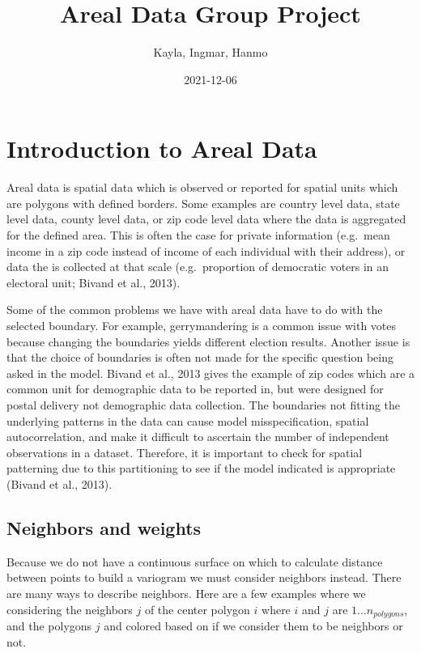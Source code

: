 \documentclass[
]{article}
\title{Areal Data Group Project}
\author{Kayla, Ingmar, Hanmo}
\date{2021-12-06}
\begin{document}
\maketitle

{
\setcounter{tocdepth}{3}
\tableofcontents
}
\newpage

\hypertarget{introduction-to-areal-data}{%
\section{Introduction to Areal Data}\label{introduction-to-areal-data}}

Areal data is spatial data which is observed or reported for spatial
units which are polygons with defined borders. Some examples are country
level data, state level data, county level data, or zip code level data
where the data is aggregated for the defined area. This is often the
case for private information (e.g.~mean income in a zip code instead of
income of each individual with their address), or data the is collected
at that scale (e.g.~proportion of democratic voters in an electoral
unit; Bivand et al., 2013).

Some of the common problems we have with areal data have to do with the
selected boundary. For example, gerrymandering is a common issue with
votes because changing the boundaries yields different election results.
Another issue is that the choice of boundaries is often not made for the
specific question being asked in the model. Bivand et al., 2013 gives
the example of zip codes which are a common unit for demographic data to
be reported in, but were designed for postal delivery not demographic
data collection. The boundaries not fitting the underlying patterns in
the data can cause model misspecification, spatial autocorrelation, and
make it difficult to ascertain the number of independent observations in
a dataset. Therefore, it is important to check for spatial patterning
due to this partitioning to see if the model indicated is appropriate
(Bivand et al., 2013).

\hypertarget{neighbors-and-weights}{%
\subsection{Neighbors and weights}\label{neighbors-and-weights}}

Because we do not have a continuous surface on which to calculate
distance between points to build a variogram we must consider neighbors
instead. There are many ways to describe neighbors. Here are a few
examples where we considering the neighbors \(j\) of the center polygon
\(i\) where \(i\) and \(j\) are \(1\dots n_{polygons}\), and the
polygons \(j\) and colored based on if we consider them to be neighbors
or not.
\end{document}
